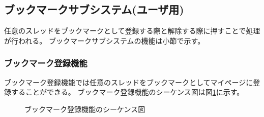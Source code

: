 \documentclass[a4j]{jarticle}
\begin{document}
  \subsection{ブックマークサブシステム(ユーザ用)}
  任意のスレッドをブックマークとして登録する際と解除する際に押すことで処理が行われる。
  ブックマークサブシステムの機能は小節で示す。
  \subsubsection{ブックマーク登録機能}
  ブックマーク登録機能では任意のスレッドをブックマークとしてマイページに登録することができる。
  ブックマーク登録機能のシーケンス図は図\ref{fig:bookmark_register.png}に示す。
  \begin{figure}[H]
    \centering
    \caption{ブックマーク登録機能のシーケンス図}
    \label{fig:bookmark_register.png}
  \end{figure}
\end{document}
